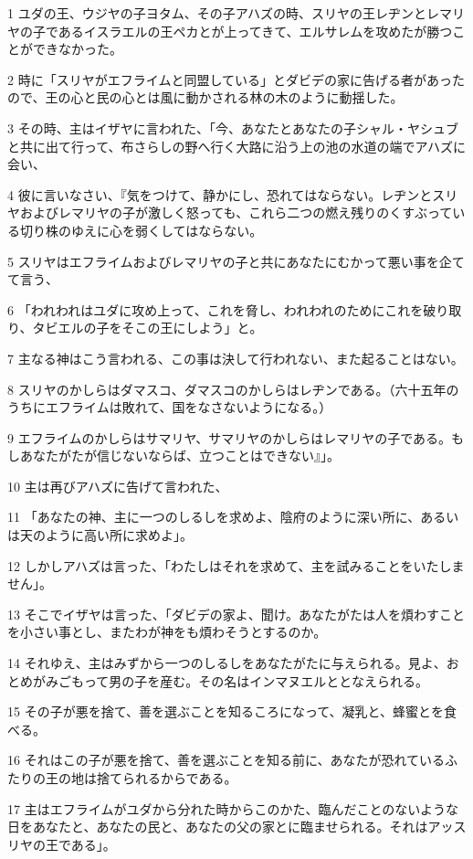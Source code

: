 \par 1 ユダの王、ウジヤの子ヨタム、その子アハズの時、スリヤの王レヂンとレマリヤの子であるイスラエルの王ペカとが上ってきて、エルサレムを攻めたが勝つことができなかった。
\par 2 時に「スリヤがエフライムと同盟している」とダビデの家に告げる者があったので、王の心と民の心とは風に動かされる林の木のように動揺した。
\par 3 その時、主はイザヤに言われた、「今、あなたとあなたの子シャル・ヤシュブと共に出て行って、布さらしの野へ行く大路に沿う上の池の水道の端でアハズに会い、
\par 4 彼に言いなさい、『気をつけて、静かにし、恐れてはならない。レヂンとスリヤおよびレマリヤの子が激しく怒っても、これら二つの燃え残りのくすぶっている切り株のゆえに心を弱くしてはならない。
\par 5 スリヤはエフライムおよびレマリヤの子と共にあなたにむかって悪い事を企てて言う、
\par 6 「われわれはユダに攻め上って、これを脅し、われわれのためにこれを破り取り、タビエルの子をそこの王にしよう」と。
\par 7 主なる神はこう言われる、この事は決して行われない、また起ることはない。
\par 8 スリヤのかしらはダマスコ、ダマスコのかしらはレヂンである。（六十五年のうちにエフライムは敗れて、国をなさないようになる。）
\par 9 エフライムのかしらはサマリヤ、サマリヤのかしらはレマリヤの子である。もしあなたがたが信じないならば、立つことはできない』」。
\par 10 主は再びアハズに告げて言われた、
\par 11 「あなたの神、主に一つのしるしを求めよ、陰府のように深い所に、あるいは天のように高い所に求めよ」。
\par 12 しかしアハズは言った、「わたしはそれを求めて、主を試みることをいたしません」。
\par 13 そこでイザヤは言った、「ダビデの家よ、聞け。あなたがたは人を煩わすことを小さい事とし、またわが神をも煩わそうとするのか。
\par 14 それゆえ、主はみずから一つのしるしをあなたがたに与えられる。見よ、おとめがみごもって男の子を産む。その名はインマヌエルととなえられる。
\par 15 その子が悪を捨て、善を選ぶことを知るころになって、凝乳と、蜂蜜とを食べる。
\par 16 それはこの子が悪を捨て、善を選ぶことを知る前に、あなたが恐れているふたりの王の地は捨てられるからである。
\par 17 主はエフライムがユダから分れた時からこのかた、臨んだことのないような日をあなたと、あなたの民と、あなたの父の家とに臨ませられる。それはアッスリヤの王である」。
